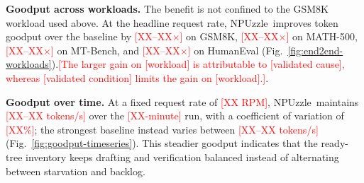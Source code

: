 \documentclass[sigconf,nonacm,10pt]{acmart}
\newcommand{\name}{NPUzzle\xspace}
\begin{document}
{{

\noindent\textbf{Goodput across workloads.}
The benefit is not confined to the GSM8K workload used above. At the headline
request rate, \name\ improves token goodput over the baseline by
\textcolor{red}{[XX--XX$\times$]} on GSM8K, \textcolor{red}{[XX--XX$\times$]} on
MATH-500, \textcolor{red}{[XX--XX$\times$]} on MT-Bench, and
\textcolor{red}{[XX--XX$\times$]} on HumanEval
(Fig.~\ref{fig:end2end-workloads}).\textcolor{red}{[The larger gain on [workload] is attributable to [validated
cause], whereas [validated condition] limits the gain on [workload].]}.

\noindent\textbf{Goodput over time.}
At a fixed request rate of \textcolor{red}{[XX RPM]}, \name\ maintains
\textcolor{red}{[XX--XX tokens/s]} over the \textcolor{red}{[XX-minute]} run,
with a coefficient of variation of \textcolor{red}{[XX\%]}; the strongest
baseline instead varies between \textcolor{red}{[XX--XX tokens/s]}
(Fig.~\ref{fig:goodput-timeseries}). This steadier goodput indicates that the
ready-tree inventory keeps drafting and verification balanced instead of
alternating between starvation and backlog.

}}
\end{document}
